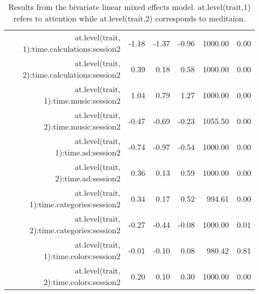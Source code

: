 \begin{table}[ht]
\begin{tabular}{rrrrrr}
  at.level(trait, 1):time.calculations:session2 & -1.18 & -1.37 & -0.96 & 1000.00 & 0.00 \\ 
  at.level(trait, 2):time.calculations:session2 & 0.39 & 0.18 & 0.58 & 1000.00 & 0.00 \\ 
  at.level(trait, 1):time.music:session2 & 1.04 & 0.79 & 1.27 & 1000.00 & 0.00 \\ 
  at.level(trait, 2):time.music:session2 & -0.47 & -0.69 & -0.23 & 1055.50 & 0.00 \\ 
  at.level(trait, 1):time.ad:session2 & -0.74 & -0.97 & -0.54 & 1000.00 & 0.00 \\ 
  at.level(trait, 2):time.ad:session2 & 0.36 & 0.13 & 0.59 & 1000.00 & 0.00 \\ 
  at.level(trait, 1):time.categories:session2 & 0.34 & 0.17 & 0.52 & 994.61 & 0.00 \\ 
  at.level(trait, 2):time.categories:session2 & -0.27 & -0.44 & -0.08 & 1000.00 & 0.01 \\ 
  at.level(trait, 1):time.colors:session2 & -0.01 & -0.10 & 0.08 & 980.42 & 0.81 \\ 
  at.level(trait, 2):time.colors:session2 & 0.20 & 0.10 & 0.30 & 1000.00 & 0.00 \\ 
   \hline
\end{tabular}
\caption{Results from the bivariate
               linear mixed effects model. at.level(trait,1) refers to attention while 
               at.level(trait,2) corresponds to meditaion.} 
\label{tab:bivariate}
\end{table}
